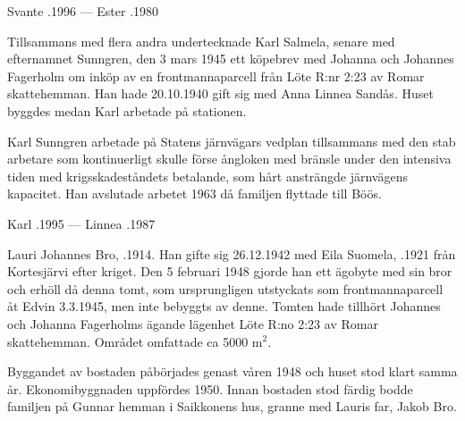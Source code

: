 Svante .1996  ---  Ester .1980


Tillsammans med flera andra undertecknade Karl Salmela, senare  med efternamnet Sunngren, den 3 mars 1945 ett köpebrev med Johanna och Johannes Fagerholm om inköp av en frontmannaparcell från Löte R:nr 2:23 av Romar skattehemman. Han hade 20.10.1940 gift sig med Anna Linnea Sandås. Huset byggdes medan Karl arbetade på stationen.
\begin{jhchildren}
  \item {}
  \item {}
  \item {}
  \item {}
  \item {}
\end{jhchildren}

Karl Sunngren arbetade på Statens järnvägars vedplan tillsammans med den stab arbetare som kontinuerligt skulle förse ångloken med bränsle under den intensiva tiden med krigsskadeståndets betalande, som hårt ansträngde järnvägens kapacitet. Han avslutade arbetet 1963 då familjen flyttade till Böös.

Karl .1995  ---  Linnea .1987






Lauri Johannes Bro, .1914. Han gifte sig 26.12.1942 med Eila Suomela, .1921 från Kortesjärvi efter kriget. Den 5 februari 1948 gjorde han ett ägobyte med sin bror  och erhöll då denna tomt, som ursprungligen utstyckats som frontmannaparcell åt Edvin 3.3.1945, men inte bebyggts av denne. Tomten hade tillhört Johannes och Johanna Fagerholms ägande lägenhet Löte R:no 2:23 av Romar skattehemman. Området omfattade ca 5000 m$^2$.

Byggandet av bostaden påbörjades genast våren 1948 och huset stod klart samma år. Ekonomibyggnaden uppfördes 1950. Innan bostaden stod färdig bodde familjen på Gunnar hemman i Saikkonens hus, granne med Lauris far, Jakob Bro.

